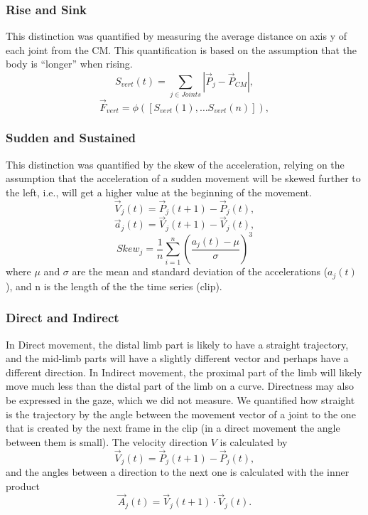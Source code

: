 \documentclass[11pt,twocolumn,varwidth=true,a4paper,fleqn]{sigchi}
\begin{document}
\subsubsection{Rise and Sink}
This distinction was quantified by measuring the average distance on 
axis y of each joint from the CM. This quantification is based on the 
assumption that the body is ``longer'' when rising.
\begin{equation*}
S_{vert}(t) = \sum_{j \in Joints}\left|\vec{P}_{j}-\vec{P}_{CM}\right|,
\end{equation*}
\begin{equation*}
\vec{F}_{vert} = \phi([S_{vert}(1), \ldots S_{vert}(n)]),
\end{equation*}

\subsubsection{Sudden and Sustained}
This distinction was quantified by the skew of the acceleration, relying on the assumption that the acceleration of a sudden movement will be skewed further to the left, i.e., will get a higher value at the beginning of the movement.
\begin{equation*}
\vec{V}_{j}(t) = \vec{P}_{j}(t+1) - \vec{P}_{j}(t),
\end{equation*}
\begin{equation*}
\vec{a}_j(t) = \vec{V}_{j}(t+1) - \vec{V}_{j}(t),
\end{equation*}
\begin{equation*}
Skew_j = \frac{1}{n}\sum_{i=1}^{n}(\frac{a_j(t) - \mu}{\sigma})^3
\end{equation*}
where $\mu$ and $\sigma$ are the mean and standard deviation of the accelerations ($a_j(t)$), and n is the length of the the time series (clip).
\subsubsection{Direct and Indirect}
In Direct movement, the distal limb part is likely to have a straight trajectory, and the mid-limb parts will have a slightly different vector and perhaps have a different direction.  In Indirect movement, the proximal part of the limb will likely move much less than the distal part of the limb on a curve.   Directness may also be expressed in the gaze, which we did not measure. We quantified how straight is the trajectory by the angle between the movement vector of a joint to the one that is created by the next frame in the clip (in a direct movement the angle between them is small).
The velocity direction $V$ is calculated by
\begin{equation*}
\vec{V}_{j}(t) = \vec{P}_{j}(t+1) - \vec{P}_{j}(t),
\end{equation*}
and the angles between a direction to the next one is calculated with the inner product
\begin{equation*}
\vec{A}_{j}(t) = \vec{V}_{j}(t+1) \cdot \vec{V}_{j}(t).
\end{equation*}
\end{document}

